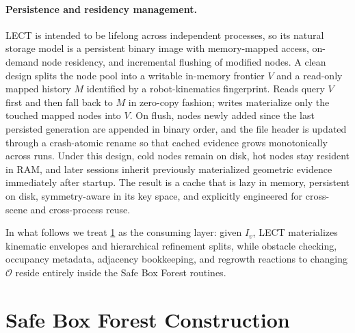 \documentclass[journal]{IEEEtran}
\begin{document}
\paragraph{Persistence and residency management.}
LECT is intended to be lifelong across independent processes, so its natural
storage model is a persistent binary image with memory-mapped access,
on-demand node residency, and incremental flushing of modified nodes. A clean
design splits the node pool into a writable in-memory frontier $V$ and a
read-only mapped history $M$ identified by a robot-kinematics fingerprint.
Reads query $V$ first and then fall back to $M$ in zero-copy fashion; writes
materialize only the touched mapped nodes into $V$. On flush, nodes newly added
since the last persisted generation are appended in binary order, and the file
header is updated through a crash-atomic rename so that cached evidence grows
monotonically across runs. Under this design, cold nodes remain on disk, hot
nodes stay resident in RAM, and later sessions inherit previously materialized
geometric evidence immediately after startup. The result is a cache that is
lazy in memory, persistent on disk, symmetry-aware in its key space, and
explicitly engineered for cross-scene and cross-process reuse.

In what follows we treat \cref{sec:forest} as the consuming layer: given $I_v$, LECT
materializes kinematic envelopes and hierarchical refinement splits, while obstacle
checking, occupancy metadata, adjacency bookkeeping, and regrowth reactions to
changing $\mathcal{O}$ reside entirely inside the Safe Box Forest routines.

\section{Safe Box Forest Construction}\label{sec:forest}
\end{document}
